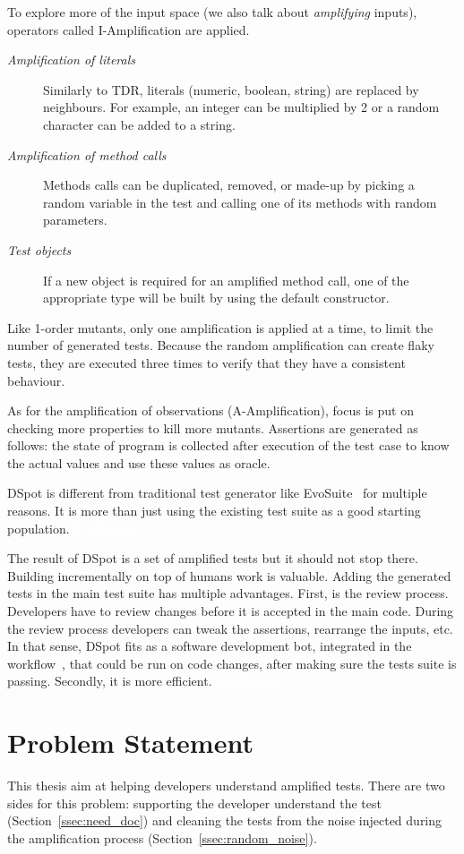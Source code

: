 \documentclass[11pt]{sdm_internship}
\newcommand{\todo}[1]{\colorbox{Red!75}{\textcolor{white}{\textbf{TODO\ifx&#1&\else: #1\fi}}}}
\newcommand{\dspot}{DSpot\xspace}
\theoremstyle{definition}
\begin{document}
To explore more of the input space (we also talk about \emph{amplifying} inputs), operators called I-Amplification are applied.
\begin{description}
  \item[\textit{Amplification of literals}] Similarly to TDR, literals (numeric, boolean, string) are replaced by neighbours. For example, an integer can be multiplied by 2 or a random character can be added to a string.
  \item[\textit{Amplification of method calls}] Methods calls can be duplicated, removed, or made-up by picking a random variable in the test and calling one of its methods with random parameters.
  \item[\textit{Test objects}] If a new object is required for an amplified method call, one of the appropriate type will be built by using the default constructor.
\end{description}
Like 1-order mutants, only one amplification is applied at a time, to limit the number of generated tests.
Because the random amplification can create flaky tests, they are executed three times to verify that they have a consistent behaviour.

As for the amplification of observations (A-Amplification), focus is put on checking more properties to kill more mutants.
Assertions are generated as follows: the state of program is collected after execution of the test case to know the actual values and use these values as oracle.

\dspot{} is different from traditional test generator like EvoSuite~\cite{fraser2011evosuite} for multiple reasons.
It is more than just using the existing test suite as a good starting population.
\todo{}

The result of \dspot{} is a set of amplified tests but it should not stop there.
Building incrementally on top of humans work is valuable.
Adding the generated tests in the main test suite has multiple advantages.
First, is the review process.
Developers have to review changes before it is accepted in the main code.
During the review process developers can tweak the assertions, rearrange the inputs, etc.
In that sense, \dspot{} fits as a software development bot, integrated in the workflow~\cite{urli2018design}, that could be run on code changes, after making sure the tests suite is passing.
Secondly, it is more efficient.\todo{}


\section{Problem Statement}%
\label{sec:problem_statement}
This thesis aim at helping developers understand amplified tests.
There are two sides for this problem: supporting the developer understand the test (Section~\ref{ssec:need_doc}) and cleaning the tests from the noise injected during the amplification process (Section~\ref{ssec:random_noise}).
\end{document}
